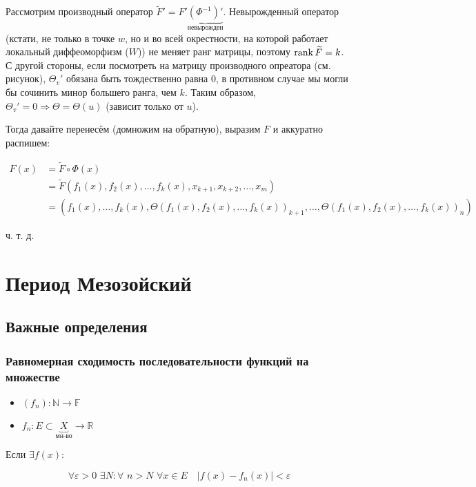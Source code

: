 \documentclass{article}
\def\dbl{\,\,}
\begin{document}
Рассмотрим производный оператор $\widetilde{F}' = F' \underbrace{\left(\Phi^{-1}\right)'}_{\text{невырожден}}$. Невырожденный оператор (кстати, не только в точке $w$, но и во всей окрестности, на которой работает локальный диффеоморфизм ($W$)) не меняет ранг матрицы, поэтому $\rank \widetilde{F} = k$. С другой стороны, если посмотреть на матрицу производного опреатора (см. рисунок), $\Theta_v'$ обязана быть тождественно равна 0, в противном случае мы могли бы сочинить минор большего ранга, чем $k$. Таким образом, $\Theta_v' = 0 \Rightarrow \Theta = \Theta(u)$ (зависит только от $u$).

Тогда давайте перенесём (домножим на обратную), выразим $F$ и аккуратно распишем:

\begin{align*}
        F(x) &= \widetilde{F} \circ \Phi (x) \\
        &= \widetilde{F}(f_1(x), f_2(x), \ldots, f_k(x), x_{k + 1}, x_{k + 2}, \ldots, x_m) \\
        &= (f_1(x), \ldots, f_k(x), \Theta\left(f_1(x), f_2(x), \ldots, f_k(x)\right)_{k + 1}, \ldots, \Theta\left(f_1(x), f_2(x), \ldots, f_k(x)\right)_n)
\end{align*}

ч. т. д.

\newpage

\section{Период Мезозойский}
\subsection{Важные определения}

\subsubsection{Равномерная сходимость последовательности функций на множестве}

\begin{itemize}
    \item $(f_n): \mathbb{N} \rightarrow \mathbb{F}$
    \item $f_n: E \subset \underbrace{X}_{\text{мн-во}} \rightarrow \mathbb{R}$
\end{itemize}

Если $\exists f(x)$:

\[\forall \varepsilon > 0 \dbl \exists N: \forall \dbl n > N \dbl \forall x \in E \quad |f(x) - f_n(x)| < \varepsilon\]
\end{document}
